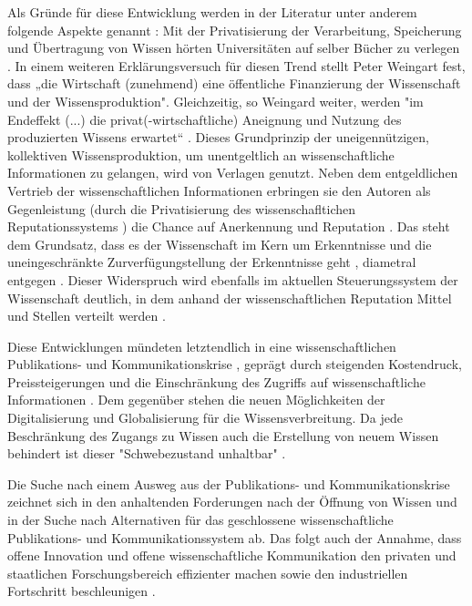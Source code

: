 Als Gründe für diese Entwicklung werden in der Literatur unter anderem folgende Aspekte genannt \cite{suchen}: Mit der Privatisierung der Verarbeitung, Speicherung und Übertragung von Wissen hörten Universitäten auf selber Bücher zu verlegen \cite{cite:0}. In einem weiteren Erklärungsversuch für diesen Trend stellt Peter Weingart fest, dass „die Wirtschaft (zunehmend) eine öffentliche Finanzierung der Wissenschaft und der Wissensproduktion". Gleichzeitig, so Weingard weiter, werden "im Endeffekt (...) die privat(-wirtschaftliche) Aneignung und Nutzung des produzierten Wissens erwartet“ \cite{cite:2}. Dieses Grundprinzip der uneigennützigen, kollektiven Wissensproduktion, um unentgeltlich an wissenschaftliche Informationen zu gelangen, wird von Verlagen genutzt. Neben dem entgeldlichen Vertrieb der wissenschaftlichen Informationen erbringen sie den Autoren als Gegenleistung (durch die Privatisierung des wissenschafltichen Reputationssystems \cite{suchen}) die Chance auf Anerkennung und Reputation \cite{cite:21a}. Das steht dem Grundsatz, dass es der Wissenschaft im Kern um Erkenntnisse und die uneingeschränkte Zurverfügungstellung der Erkenntnisse geht \cite{hanekop_2006}, diametral entgegen \cite{offhaus_2012_institutionelle_repos}. Dieser Widerspruch wird ebenfalls im aktuellen Steuerungssystem der Wissenschaft deutlich, in dem anhand der wissenschaftlichen Reputation Mittel und Stellen verteilt werden \cite{cite:4}.

Diese Entwicklungen mündeten letztendlich in eine wissenschaftlichen Publikations- und Kommunikationskrise \cite{suchen}, geprägt durch steigenden Kostendruck, Preissteigerungen und die Einschränkung des Zugriffs auf wissenschaftliche Informationen \cite{Hess_2006}. Dem gegenüber stehen die neuen Möglichkeiten der Digitalisierung und Globalisierung für die Wissensverbreitung. Da jede Beschränkung des Zugangs zu Wissen auch die Erstellung von neuem Wissen behindert \cite{cite:5} \cite{cite:8} ist dieser "Schwebezustand unhaltbar" \cite{suchen}. 

Die Suche nach einem Ausweg aus der Publikations- und Kommunikationskrise zeichnet sich in den anhaltenden Forderungen nach der Öffnung von Wissen und in der Suche nach Alternativen für das geschlossene wissenschaftliche Publikations- und Kommunikationssystem ab. Das folgt auch der Annahme, dass offene Innovation und offene wissenschaftliche Kommunikation den privaten und staatlichen Forschungsbereich effizienter machen sowie den industriellen Fortschritt beschleunigen \cite{cite:7}. 


